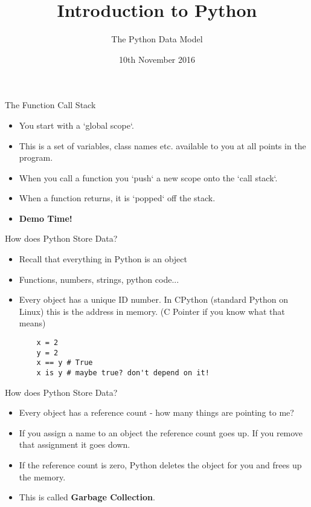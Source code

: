 \documentclass{beamer}
\title{Introduction to Python}
\subtitle{The Python Data Model}
\date{10th November 2016}
\begin{document}
\lstset{language=Python}

\begin{frame}
  \titlepage
\end{frame}


\begin{frame}[fragile]{The Function Call Stack}
\begin{itemize}
\item{You start with a `global scope`. }
\item{This is a set of variables, class names etc. available to you at all points in the program.}
\pause
\item{When you call a function you `push` a new scope onto the `call stack`.}
\pause
\item{When a function returns, it is `popped` off the stack.}
\pause
\item{\bf{Demo Time!}}
\end{itemize}
\end{frame}

\begin{frame}[fragile]{How does Python Store Data?}
\begin{itemize}
\item{Recall that everything in Python is an object}
\item{Functions, numbers, strings, python code...}
\pause
\item{Every object has a unique ID number. In CPython (standard Python on Linux) this is the address in memory. (C Pointer if you know what that means) }
\pause
\begin{block}{}
	\begin{lstlisting}
	x = 2
	y = 2
	x == y # True
	x is y # maybe true? don't depend on it!
	\end{lstlisting}
\end{block}
\end{itemize}
\end{frame}

\begin{frame}[fragile]{How does Python Store Data?}
\begin{itemize}
\item{Every object has a reference count - how many things are pointing to me?}
\pause
\item{If you assign a name to an object the reference count goes up. If you remove that assignment it goes down.}
\pause
\item{If the reference count is zero, Python deletes the object for you and frees up the memory.}
\item{This is called \textbf{Garbage Collection}.}
\end{itemize}
\end{frame}
\end{document}
